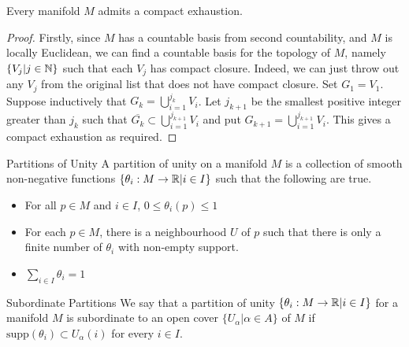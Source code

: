 \documentclass[a4paper]{article}
\begin{document}
\begin{prp}{}{} Every manifold $M$ admits a compact exhaustion. \tcbline
\begin{proof}
Firstly, since $M$ has a countable basis from second countability, and $M$ is locally Euclidean, we can find a countable basis for the topology of $M$, namely $\{V_j|j\in\mathbb{N}\}$ such that each $V_j$ has compact closure. Indeed, we can just throw out any $V_j$ from the original list that does not have compact closure. Set $G_1=V_1$. Suppose inductively that $G_k=\bigcup_{i=1}^{j_k}V_i$. Let $j_{k+1}$ be the smallest positive integer greater than $j_k$ such that $\overline{G_k}\subset\bigcup_{i=1}^{j_{k+1}}V_i$ and put $G_{k+1}=\bigcup_{i=1}^{j_{k+1}}V_i$. This gives a compact exhaustion as required. 
\end{proof}
\end{prp}

\begin{defn}{Partitions of Unity}{} A partition of unity on a manifold $M$ is a collection of smooth non-negative functions $\{\theta_i:M\to\mathbb{R}|i\in I\}$ such that the following are true. 
\begin{itemize}
\item For all $p\in M$ and $i\in I$, $0\leq\theta_i(p)\leq 1$
\item For each $p\in M$, there is a neighbourhood $U$ of $p$ such that there is only a finite number of $\theta_i$ with non-empty support. 
\item $\sum_{i\in I}\theta_i=1$
\end{itemize}
\end{defn}

\begin{defn}{Subordinate Partitions}{} We say that a partition of unity $\{\theta_i:M\to\mathbb{R}|i\in I\}$ for a manifold $M$ is subordinate to an open cover $\{U_\alpha|\alpha\in A\}$ of $M$ if $\text{supp}(\theta_i)\subset U_\alpha(i)$ for every $i\in I$. 
\end{defn}
\end{document}
